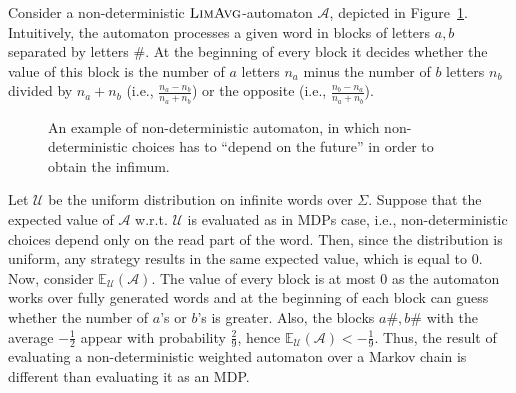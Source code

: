 \documentclass{lmcs}
\newcommand{\flimavg}{\textsc{LimAvg}}
\newcommand{\aut}{\mathcal{A}}
\newcommand{\expected}{\mathbb{E}}
\newcommand{\calU}{\mathcal{U}}
\begin{document}
\begin{exa}
Consider a non-deterministic $\flimavg$-automaton $\aut$, depicted in Figure~\ref{fig:nondet-vs-MDP}.
Intuitively, the automaton processes a given word in blocks of letters $a,b$ separated by letters $\#$.
At the beginning of every block it decides whether the value of this block is
the number of $a$ letters $n_a$ minus the number of $b$ letters $n_b$ divided by $n_a + n_b$
(i.e., $\frac{n_a - n_b}{n_a + n_b}$) or
the opposite (i.e., $\frac{n_b - n_a}{n_a + n_b}$).
\begin{figure}
\centering
{}
\caption{An example of non-deterministic automaton, in which non-deterministic choices has to ``depend on the future'' in order to obtain the infimum.}\label{fig:nondet-vs-MDP}
\vspace{-1em}
\end{figure}
Let $\calU$ be the uniform distribution on infinite words over $\Sigma$.
Suppose that the expected value of $\aut$ w.r.t. $\calU$ is evaluated as in MDPs case, i.e.,
non-deterministic choices depend only on the read part of the word.
Then, since the distribution is uniform, any strategy results in the same expected value, which is equal to $0$.
Now, consider $\expected_{\calU}(\aut)$. The value of every block is at most $0$ as the automaton works over fully
generated words and at the beginning of each block can guess whether the number of $a$'s or $b$'s is greater.
Also, the blocks $a\#, b\#$ with the average  $-\frac{1}{2}$ appear with probability $\frac{2}{9}$, hence
$\expected_{\calU}(\aut) < -\frac{1}{9}$.
Thus, the result of evaluating a non-deterministic weighted automaton over a Markov chain is different than evaluating
it as an MDP\@.
\end{exa}
\end{document}
